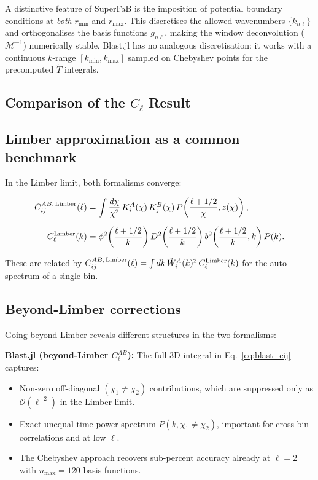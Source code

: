 A distinctive feature of SuperFaB is the imposition of potential
boundary conditions at \emph{both} $r_{\min}$ and $r_{\max}$.
This discretises the allowed wavenumbers $\{k_{n\ell}\}$ and
orthogonalises the basis functions $g_{n\ell}$, making the window
deconvolution ($\mathcal{M}^{-1}$) numerically stable.
Blast.jl has no analogous discretisation: it works with a continuous
$k$-range $[k_{\min}, k_{\max}]$ sampled on Chebyshev points for the
precomputed $\tilde{T}$ integrals.

\subsection{Comparison of the $C_\ell$ Result}

\subsection{Limber approximation as a common benchmark}

In the Limber limit, both formalisms converge:

\begin{align}
    C_{ij}^{AB,\,\rm Limber}(\ell) &=
    \int \frac{d\chi}{\chi^2}\,
    K_i^A(\chi)\,K_j^B(\chi)\,
    P\!\left(\frac{\ell+1/2}{\chi},z(\chi)\right),
    \label{eq:Clim_blast}\\[6pt]
    C_\ell^{\rm Limber}(k) &=
    \phi^2\!\left(\frac{\ell+1/2}{k}\right)
    D^2\!\left(\frac{\ell+1/2}{k}\right)
    b^2\!\left(\frac{\ell+1/2}{k},k\right)
    P(k).
    \label{eq:Clim_sfb}
\end{align}

These are related by $C_{ij}^{AB,\,\rm Limber}(\ell) =
\int dk\,\hat{W}_i^A(k)^2\,C_\ell^{\rm Limber}(k)$
for the auto-spectrum of a single bin.

\subsection{Beyond-Limber corrections}

Going beyond Limber reveals different structures in the two formalisms:

\textbf{Blast.jl (beyond-Limber $C_\ell^{AB}$):}
The full 3D integral in Eq.~\eqref{eq:blast_cij} captures:
\begin{itemize}
    \item Non-zero off-diagonal $(\chi_1\ne\chi_2)$ contributions,
    which are suppressed only as $\mathcal{O}(\ell^{-2})$ in the Limber
    limit.
    \item Exact unequal-time power spectrum
    $P(k,\chi_1\ne\chi_2)$, important for cross-bin correlations and
    at low $\ell$.
    \item The Chebyshev approach recovers sub-percent accuracy already
    at $\ell = 2$ with $n_{\max}=120$ basis functions.
\end{itemize}


